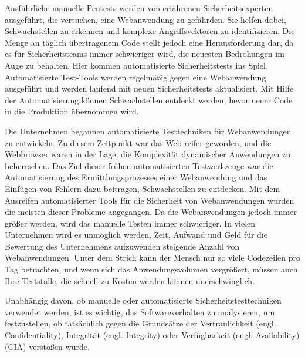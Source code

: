 Ausführliche manuelle Pentests werden von erfahrenen Sicherheitsexperten ausgeführt, die versuchen, eine Webanwendung zu gefährden. Sie helfen dabei, Schwachstellen zu erkennen und komplexe Angriffsvektoren zu identifizieren. Die Menge an täglich übertragenem Code stellt jedoch eine Herausforderung dar, da es für Sicherheitsteams immer schwieriger wird, die neuesten Bedrohungen im Auge zu behalten. Hier kommen automatisierte Sicherheitstests ins Spiel. Automatisierte Test-Tools werden regelmäßig gegen eine Webanwendung ausgeführt und werden laufend mit neuen Sicherheitstests aktualisiert. Mit Hilfe der Automatisierung können Schwachstellen entdeckt werden, bevor neuer Code in die Produktion übernommen wird\cite{wmpta17}.

Die Unternehmen begannen automatisierte Testtechniken für Webanwendungen zu entwickeln. Zu diesem Zeitpunkt war das Web reifer geworden, und die Webbrowser waren in der Lage, die Komplexität dynamischer Anwendungen zu beherrschen. Das Ziel dieser frühen automatisierten Testwerkzeuge war die Automatisierung des Ermittlungsprozesses einer Webanwendung und das Einfügen von Fehlern dazu beitragen, Schwachstellen zu entdecken. Mit dem Ausreifen automatisierter Tools für die Sicherheit von Webanwendungen wurden die meisten dieser Probleme angegangen. Da die Webanwendungen jedoch immer größer werden, wird das manuelle Testen immer schwieriger. In vielen Unternehmen wird es unmöglich werden, Zeit, Aufwand und Geld für die Bewertung des Unternehmens aufzuwenden steigende Anzahl von Webanwendungen. Unter dem Strich kann der Mensch nur so viele Codezeilen pro Tag betrachten, und wenn sich das Anwendungsvolumen vergrößert, müssen auch Ihre Testställe, die schnell zu Kosten werden können unerschwinglich\cite[2--5]{wasasibm08}.

Unabhängig davon, ob manuelle oder automatisierte Sicherheitstesttechniken verwendet werden, ist es wichtig, das Softwareverhalten zu analysieren, um festzustellen, ob tatsächlich gegen die Grundsätze der Vertraulichkeit (engl. Confidentiality), Integrität (engl. Integrity) oder Verfügbarkeit (engl. Availability) (CIA) verstoßen wurde\cite{moaast17}.











